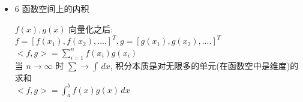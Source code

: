 \documentclass[12pt]{article}
\begin{document}
\begin{flushleft}
\begin{itemize}
              我们知道向量是有限维的:
              $\vec{v} = \begin{bmatrix}
                      v1 \\
                      v2
                  \end{bmatrix}$ \\
              向量是一个空间的移动指令, 它是由 n 个自由度(v1,v2 在数学上也称自由度)移动路线组成的 \\
              这里有一个很重要的隐藏点  v1(分量) $\cdot$ e1 这个自由度是有方向有距离的(由 e1基底提供), 它可以看成一个有箭头的线段 \\
              也就是说向量 v 的维度(2d) 是由这两个自由线段所表达的, 这个两个自由线段是可以张成这个空间 \\
              这也就是向量维度的概念 \\


              那么我们把函数 向量化(函数空间)是多少维的? 是无限维的! \\
              $y = f(x)$ 函数是一个存在于直角坐标系的标准曲线, 它是有无限个点 通过代数"惯性"连接的光滑曲线 \\
              那么向量化的函数 向量表达式是: \\
              $y = [f(x_{1}),f(x_{2}), f(x_{3}), ...]^{T}$ \\
              $f(x_{1})$ 在这里是一个分量, 但它隐藏了重要的e1(基底) 它和v1 没有区别, 它是一个有箭头的线段(自由度)! \\
              每一个线段都是可以自由移动！而非由原函数代数"惯性" 所限制 \\
              那么 这些自由度是可以张成出任何维度的空间! 绝非只是一个光滑的曲线 \\

              代数"惯性" : \\
              Example: $f(x) = x^{2}; \iff (x = 1, y = 1; x = 2 ,y = 4; x = 3, y = 9;... )\;\;$, $1,4,9$ 就存在2次幂的代数惯性 \\

              \vspace{0.5em}
        \item 6 函数空间上的内积 \

              $f(x), g(x)$ 向量化之后: \\
              $f = [f(x_{1}), f(x_{2}) ,....]^{T}, g = [g(x_{1}), g(x_{2}) ,....]^{T} $ \\
              $<f, g>  = \sum_{i = 1}^{n}f(x_{i})g(x_{i})$  \\
              当 $ n \to \infty$ 时 $\sum \to \int \, dx$, 积分本质是对无限多的单元(在函数空中是维度)的求和 \\
              $<f, g> =  \int_{a}^{b}f(x)g(x) \,dx$  \\


\end{itemize}
\end{flushleft}
\end{document}
